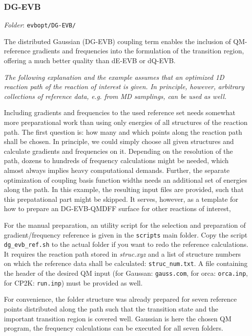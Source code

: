 \documentclass[12pt,a4paper]{scrartcl}
\begin{document}
\subsubsection{DG-EVB}
\textit{Folder}: \texttt{evbopt/DG-EVB/} \newline

The distributed Gaussian (DG-EVB) coupling term enables the inclusion of QM-reference 
gradients and frequencies into the formulation of the transition region, offering a much 
better quality than dE-EVB or dQ-EVB.

\textit{The following explanation and the example assumes that an optimized 1D reaction path
of the reaction of interest is given. In principle, however, arbitrary collections of 
reference data, e.g. from MD samplings, can be used as well.}

Including gradients and frequencies to the used reference set needs somewhat more 
preparational work than using only energies of all structures of the reaction path.
The first question is: how many and which points along the reaction path shall 
be chosen. In principle, we could simply choose all given structures and calculate 
gradients and frequencies on it.
Depending on the resolution of the path, dozens to hundreds of frequency calculations 
might be needed, which almost always implies heavy computational demands. Further, the separate 
optimization of coupling basis function widths needs an additional set of energies along 
the path.
In this example, the resulting input files are provided, such that this prepatational
part might be skipped. It serves, however, as a template for how to prepare an
DG-EVB-QMDFF surface for other reactions of interest,

For the manual preparation, an utility script for the selection and preparation 
of gradient/frequency reference  is given in the \texttt{scripts} main folder. 
Copy the script \texttt{dg\_evb\_ref.sh} to the 
actual folder if you want to redo the reference calculations.
It requires the reaction path stored in \textit{struc.xyz} and a list of structure numbers 
on which the reference data shall be calculated: \texttt{struc\_num.txt}.
A file containing the header of the desired QM input (for Gaussan: \texttt{gauss.com},
for orca: \texttt{orca.inp}, for CP2K: \texttt{run.inp}) must be provided as well.

For convenience, the folder structure was already prepared for seven reference points 
distributed along the path such that the transition state and the important transition
region is covered well. Gaussian is here the chosen QM program, the frequency 
calculations can be executed for all seven folders. 
\end{document}
